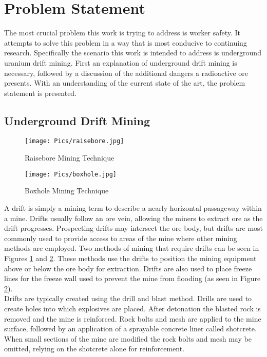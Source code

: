 \section{Problem Statement}
\label{sec:prob}
The most crucial problem this work is trying to address is worker safety. It attempts to solve this problem in a way that is most conducive to continuing research. Specifically the scenario this work is intended to address is underground uranium drift mining. First an explanation of underground drift mining is necessary, followed by a discussion of the additional dangers a radioactive ore presents. With an understanding of the current state of the art, the problem statement is presented.\\

\subsection{Underground Drift Mining}

\begin{figure}
    \centering
    \texttt{[image: Pics/raisebore.jpg]}
    \caption{Raisebore Mining Technique \cite{weblink}}
    \label{fig:raisebore}
\end{figure}
\begin{figure}
    \centering
    \texttt{[image: Pics/boxhole.jpg]}
    \caption{Boxhole Mining Technique \cite{weblink}}
    \label{fig:boxhole}
\end{figure}
A drift is simply a mining term to describe a nearly horizontal passageway within a mine. Drifts usually follow an ore vein, allowing the miners to extract ore as the drift progresses. Prospecting drifts may intersect the ore body, but drifts are most commonly used to provide access to areas of the mine where other mining methods are employed. Two methods of mining that require drifts can be seen in Figures \ref{fig:raisebore} and \ref{fig:boxhole}. These methods use the drifts to position the mining equipment above or below the ore body for extraction. Drifts are also used to place freeze lines for the freeze wall used to prevent the mine from flooding (as seen in Figure \ref{fig:boxhole}).\\

Drifts are typically created using the drill and blast method. Drills are used to create holes into which explosives are placed. After detonation the blasted rock is removed and the mine is reinforced. Rock bolts and mesh are applied to the mine surface, followed by an application of a sprayable concrete liner called shotcrete. When small sections of the mine are modified the rock bolts and mesh may be omitted, relying on the shotcrete alone for reinforcement.\\

